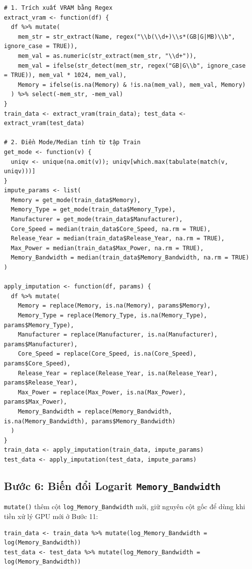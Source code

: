 \begin{verbatim}
# 1. Trích xuất VRAM bằng Regex
extract_vram <- function(df) {
  df %>% mutate(
    mem_str = str_extract(Name, regex("\\b(\\d+)\\s*(GB|G|MB)\\b", ignore_case = TRUE)),
    mem_val = as.numeric(str_extract(mem_str, "\\d+")),
    mem_val = ifelse(str_detect(mem_str, regex("GB|G\\b", ignore_case = TRUE)), mem_val * 1024, mem_val),
    Memory = ifelse(is.na(Memory) & !is.na(mem_val), mem_val, Memory)
  ) %>% select(-mem_str, -mem_val)
}
train_data <- extract_vram(train_data); test_data <- extract_vram(test_data)

# 2. Điền Mode/Median tính từ tập Train
get_mode <- function(v) {
  uniqv <- unique(na.omit(v)); uniqv[which.max(tabulate(match(v, uniqv)))]
}
impute_params <- list(
  Memory = get_mode(train_data$Memory),
  Memory_Type = get_mode(train_data$Memory_Type),
  Manufacturer = get_mode(train_data$Manufacturer),
  Core_Speed = median(train_data$Core_Speed, na.rm = TRUE),
  Release_Year = median(train_data$Release_Year, na.rm = TRUE),
  Max_Power = median(train_data$Max_Power, na.rm = TRUE),
  Memory_Bandwidth = median(train_data$Memory_Bandwidth, na.rm = TRUE)
)

apply_imputation <- function(df, params) {
  df %>% mutate(
    Memory = replace(Memory, is.na(Memory), params$Memory),
    Memory_Type = replace(Memory_Type, is.na(Memory_Type), params$Memory_Type),
    Manufacturer = replace(Manufacturer, is.na(Manufacturer), params$Manufacturer),
    Core_Speed = replace(Core_Speed, is.na(Core_Speed), params$Core_Speed),
    Release_Year = replace(Release_Year, is.na(Release_Year), params$Release_Year),
    Max_Power = replace(Max_Power, is.na(Max_Power), params$Max_Power),
    Memory_Bandwidth = replace(Memory_Bandwidth, is.na(Memory_Bandwidth), params$Memory_Bandwidth)
  )
}
train_data <- apply_imputation(train_data, impute_params)
test_data <- apply_imputation(test_data, impute_params)
\end{verbatim}

\subsection{Bước 6: Biến đổi Logarit \texttt{Memory\_Bandwidth}}
\label{sec:buoc_6}
\texttt{mutate()} thêm cột \texttt{log\_Memory\_Bandwidth} mới, giữ nguyên cột gốc để dùng khi tiền xử lý GPU mới ở Bước 11:
\begin{verbatim}
train_data <- train_data %>% mutate(log_Memory_Bandwidth = log(Memory_Bandwidth))
test_data <- test_data %>% mutate(log_Memory_Bandwidth = log(Memory_Bandwidth))
\end{verbatim}

